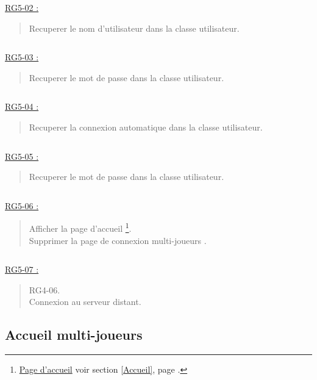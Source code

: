 \documentclass{report}
\begin{document}
			$\,$
			
			\underline{RG5-02 :}
				\begin{quote}
					Recuperer le nom d'utilisateur dans la classe utilisateur.
				\end{quote}

			$\,$
			
			\underline{RG5-03 :}
				\begin{quote}
					Recuperer le mot de passe dans la classe utilisateur.
				\end{quote}
				
			$\,$
			
			\underline{RG5-04 :}
				\begin{quote}
					Recuperer la connexion automatique dans la classe utilisateur.
				\end{quote}
				
			$\,$
			
			\underline{RG5-05 :}
				\begin{quote}
					Recuperer le mot de passe dans la classe utilisateur.
				\end{quote}

			$\,$

			\underline{RG5-06 :}
				\begin{quote}
					Afficher la page d'accueil%
						\footnote[3]{
							\hyperlink{Page d'accueil}{Page d'accueil}
							\og voir section \ref{Accueil}, page \pageref{Accueil}.\fg
						}.\\
					Supprimer la page de connexion multi-joueurs \footnotemark[2].		
				\end{quote}	

			$\,$

			\underline{RG5-07 :}
				\begin{quote}
					RG4-06.\\
					Connexion au serveur distant.			
				\end{quote}


\newpage

	\subsection{Accueil multi-joueurs}

		\hypertarget{Accueil multi-joueurs}{}
		\label{Accueil multi-joueurs}

		\begin{center}
			
		\end{center}
\end{document}
